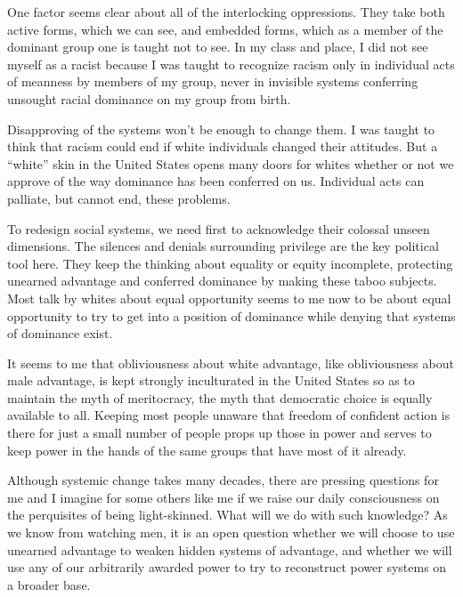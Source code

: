 \documentclass{article}
\begin{document}
One factor seems clear about all of the interlocking oppressions. They take
both active forms, which we can see, and embedded forms, which as a member of
the dominant group one is taught not to see. In my class and place, I did not
see myself as a racist because I was taught to recognize racism only in
individual acts of meanness by members of my group, never in invisible systems
conferring unsought racial dominance on my group from birth.

Disapproving of the systems won't be enough to change them. I was taught to
think that racism could end if white individuals changed their attitudes. But a
``white'' skin in the United States opens many doors for whites whether or not
we approve of the way dominance has been conferred on us. Individual acts can
palliate, but cannot end, these problems.

To redesign social systems, we need first to acknowledge their colossal unseen
dimensions. The silences and denials surrounding privilege are the key
political tool here. They keep the thinking about equality or equity
incomplete, protecting unearned advantage and conferred dominance by making
these taboo subjects. Most talk by whites about equal opportunity seems to me
now to be about equal opportunity to try to get into a position of dominance
while denying that systems of dominance exist.

It seems to me that obliviousness about white advantage, like obliviousness
about male advantage, is kept strongly inculturated in the United States so as
to maintain the myth of meritocracy, the myth that democratic choice is equally
available to all. Keeping most people unaware that freedom of confident action
is there for just a small number of people props up those in power and serves
to keep power in the hands of the same groups that have most of it already.

Although systemic change takes many decades, there are pressing questions for
me and I imagine for some others like me if we raise our daily consciousness on
the perquisites of being light-skinned. What will we do with such knowledge? As
we know from watching men, it is an open question whether we will choose to use
unearned advantage to weaken hidden systems of advantage, and whether we will
use any of our arbitrarily awarded power to try to reconstruct power systems on
a broader base.
\end{document}
